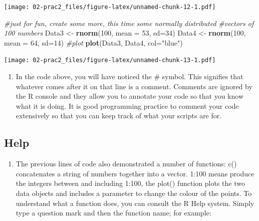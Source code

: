 \documentclass[]{book}
\newenvironment{Shaded}{\begin{snugshade}}{\end{snugshade}}
\newcommand{\CommentTok}[1]{\textcolor[rgb]{0.56,0.35,0.01}{\textit{#1}}}
\newcommand{\DataTypeTok}[1]{\textcolor[rgb]{0.13,0.29,0.53}{#1}}
\newcommand{\DecValTok}[1]{\textcolor[rgb]{0.00,0.00,0.81}{#1}}
\newcommand{\KeywordTok}[1]{\textcolor[rgb]{0.13,0.29,0.53}{\textbf{#1}}}
\newcommand{\NormalTok}[1]{#1}
\newcommand{\StringTok}[1]{\textcolor[rgb]{0.31,0.60,0.02}{#1}}
\providecommand{\tightlist}{%
  \setlength{\itemsep}{0pt}\setlength{\parskip}{0pt}}
\begin{document}
\texttt{[image: 02-prac2\_files/figure-latex/unnamed-chunk-12-1.pdf]}

\begin{Shaded}
\begin{Highlighting}[]
\CommentTok{#just for fun, create some more, this time some normally distributed}
\CommentTok{#vectors of 100 numbers}
\NormalTok{Data3 <-}\StringTok{ }\KeywordTok{rnorm}\NormalTok{(}\DecValTok{100}\NormalTok{, }\DataTypeTok{mean =} \DecValTok{53}\NormalTok{, }\DataTypeTok{sd=}\DecValTok{34}\NormalTok{)}
\NormalTok{Data4 <-}\StringTok{ }\KeywordTok{rnorm}\NormalTok{(}\DecValTok{100}\NormalTok{, }\DataTypeTok{mean =} \DecValTok{64}\NormalTok{, }\DataTypeTok{sd=}\DecValTok{14}\NormalTok{)}
\CommentTok{#plot}
\KeywordTok{plot}\NormalTok{(Data3, Data4, }\DataTypeTok{col=}\StringTok{"blue"}\NormalTok{)}
\end{Highlighting}
\end{Shaded}

\texttt{[image: 02-prac2\_files/figure-latex/unnamed-chunk-13-1.pdf]}

\begin{enumerate}
\def\labelenumi{\arabic{enumi}.}
\setcounter{enumi}{13}
\tightlist
\item
  In the code above, you will have noticed the \# symbol. This signifies that whatever comes after it on that line is a comment. Comments are ignored by the R console and they allow you to annotate your code so that you know what it is doing. It is good programming practice to comment your code extensively so that you can keep track of what your scripts are for.
\end{enumerate}

\hypertarget{help}{%
\subsection{Help}\label{help}}

\begin{enumerate}
\def\labelenumi{\arabic{enumi}.}
\setcounter{enumi}{14}
\tightlist
\item
  The previous lines of code also demonstrated a number of functions: c() concatenates a string of numbers together into a vector. 1:100 means produce the integers between and including 1:100, the plot() function plots the two data objects and includes a parameter to change the colour of the points. To understand what a function does, you can consult the R Help system. Simply type a question mark and then the function name; for example:
\end{enumerate}
\end{document}
